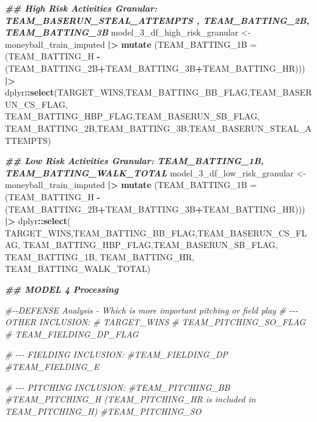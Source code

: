 \documentclass[
]{article}
\newenvironment{Shaded}{\begin{snugshade}}{\end{snugshade}}
\newcommand{\AttributeTok}[1]{\textcolor[rgb]{0.13,0.29,0.53}{#1}}
\newcommand{\CommentTok}[1]{\textcolor[rgb]{0.56,0.35,0.01}{\textit{#1}}}
\newcommand{\DocumentationTok}[1]{\textcolor[rgb]{0.56,0.35,0.01}{\textbf{\textit{#1}}}}
\newcommand{\FunctionTok}[1]{\textcolor[rgb]{0.13,0.29,0.53}{\textbf{#1}}}
\newcommand{\NormalTok}[1]{#1}
\newcommand{\OtherTok}[1]{\textcolor[rgb]{0.56,0.35,0.01}{#1}}
\newcommand{\SpecialCharTok}[1]{\textcolor[rgb]{0.81,0.36,0.00}{\textbf{#1}}}
\begin{document}
\begin{Shaded}
\begin{Highlighting}[]
\DocumentationTok{\#\# High Risk Activities Granular: TEAM\_BASERUN\_STEAL\_ATTEMPTS , TEAM\_BATTING\_2B,  TEAM\_BATTING\_3B}
\NormalTok{model\_3\_df\_high\_risk\_granular }\OtherTok{\textless{}{-}}\NormalTok{ moneyball\_train\_imputed }\SpecialCharTok{|\textgreater{}}
  \FunctionTok{mutate}\NormalTok{ (}\AttributeTok{TEAM\_BATTING\_1B =}\NormalTok{ (TEAM\_BATTING\_H }\SpecialCharTok{{-}}\NormalTok{ (TEAM\_BATTING\_2B}\SpecialCharTok{+}\NormalTok{TEAM\_BATTING\_3B}\SpecialCharTok{+}\NormalTok{TEAM\_BATTING\_HR))) }\SpecialCharTok{|\textgreater{}}
\NormalTok{  dplyr}\SpecialCharTok{::}\FunctionTok{select}\NormalTok{(TARGET\_WINS,TEAM\_BATTING\_BB\_FLAG,TEAM\_BASERUN\_CS\_FLAG, TEAM\_BATTING\_HBP\_FLAG,TEAM\_BASERUN\_SB\_FLAG,}
\NormalTok{          TEAM\_BATTING\_2B,TEAM\_BATTING\_3B,TEAM\_BASERUN\_STEAL\_ATTEMPTS) }

\DocumentationTok{\#\# Low Risk Activities Granular: TEAM\_BATTING\_1B, TEAM\_BATTING\_WALK\_TOTAL}
\NormalTok{model\_3\_df\_low\_risk\_granular }\OtherTok{\textless{}{-}}\NormalTok{ moneyball\_train\_imputed }\SpecialCharTok{|\textgreater{}}
  \FunctionTok{mutate}\NormalTok{ (}\AttributeTok{TEAM\_BATTING\_1B =}\NormalTok{ (TEAM\_BATTING\_H }\SpecialCharTok{{-}}\NormalTok{ (TEAM\_BATTING\_2B}\SpecialCharTok{+}\NormalTok{TEAM\_BATTING\_3B}\SpecialCharTok{+}\NormalTok{TEAM\_BATTING\_HR))) }\SpecialCharTok{|\textgreater{}}
\NormalTok{  dplyr}\SpecialCharTok{::}\FunctionTok{select}\NormalTok{( TARGET\_WINS,TEAM\_BATTING\_BB\_FLAG,TEAM\_BASERUN\_CS\_FLAG, TEAM\_BATTING\_HBP\_FLAG,TEAM\_BASERUN\_SB\_FLAG,}
\NormalTok{          TEAM\_BATTING\_1B, TEAM\_BATTING\_HR, TEAM\_BATTING\_WALK\_TOTAL)}

    
\DocumentationTok{\#\# MODEL 4 Processing}

\CommentTok{\#{-}{-}DEFENSE Analysis {-} Which is more important pitching or field play}
\CommentTok{\# {-}{-}{-} OTHER INCLUSION:}
\CommentTok{\#     TARGET\_WINS}
\CommentTok{\#     TEAM\_PITCHING\_SO\_FLAG}
\CommentTok{\#     TEAM\_FIELDING\_DP\_FLAG}

\CommentTok{\# {-}{-}{-} FIELDING INCLUSION:}
\CommentTok{\#TEAM\_FIELDING\_DP}
\CommentTok{\#TEAM\_FIELDING\_E}

\CommentTok{\# {-}{-}{-} PITCHING INCLUSION:}
\CommentTok{\#TEAM\_PITCHING\_BB }
\CommentTok{\#TEAM\_PITCHING\_H (TEAM\_PITCHING\_HR is included in TEAM\_PITCHING\_H) }
\CommentTok{\#TEAM\_PITCHING\_SO}


\end{Highlighting}
\end{Shaded}
\end{document}
